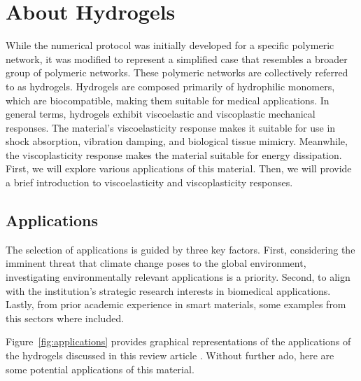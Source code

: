 \section{About Hydrogels}

While the numerical protocol was initially developed for a specific polymeric network, it was modified to represent a simplified case that resembles a broader group of polymeric networks.
These polymeric networks are collectively referred to as hydrogels.
Hydrogels are composed primarily of hydrophilic monomers, which are biocompatible, making them suitable for medical applications.
In general terms, hydrogels exhibit viscoelastic and viscoplastic mechanical responses.
The material's viscoelasticity response makes it suitable for use in shock absorption, vibration damping, and biological tissue mimicry.
Meanwhile, the viscoplasticity response makes the material suitable for energy dissipation.
First, we will explore various applications of this material.
Then, we will provide a brief introduction to viscoelasticity and viscoplasticity responses.

\subsection{Applications}

The selection of applications is guided by three key factors. 
First, considering the imminent threat that climate change poses to the global environment, investigating environmentally relevant applications is a priority.
Second, to align with the institution's strategic research interests in biomedical applications.
Lastly, from prior academic experience in smart materials, some examples from this sectors where included.

Figure~\ref{fig:applications} provides graphical representations of the applications of the hydrogels discussed in this review article \citep{petelinsekToughHydrogelsLoadBearing2024}.
Without further ado, here are some potential applications of this material.

